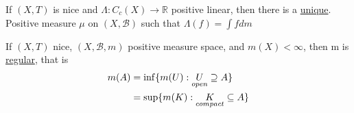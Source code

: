 \begin{theorem}
	If $(X,T)$ is nice and  $\Lambda : C_c (X) \to \mathbb{R}$ positive linear, then there is a \underline{unique}. Positive measure $\mu$ on $(X,\mathcal{B})$ such that  $\Lambda(f) = \int f dm$
\end{theorem}

\begin{lemma}
	If $(X,T)$ nice,  $(X, \mathcal{B}, m)$ positive measure space, and $m(X) < \infty$, then m is \underline{regular}, that is
	\begin{align}
		m(A) &= \inf\{m(U) : \underset{open}{U} \supseteq A\} \\
			 &= \sup\{m(K) : \underset{compact}{K} \subseteq A\}
	\end{align} 
\end{lemma}


